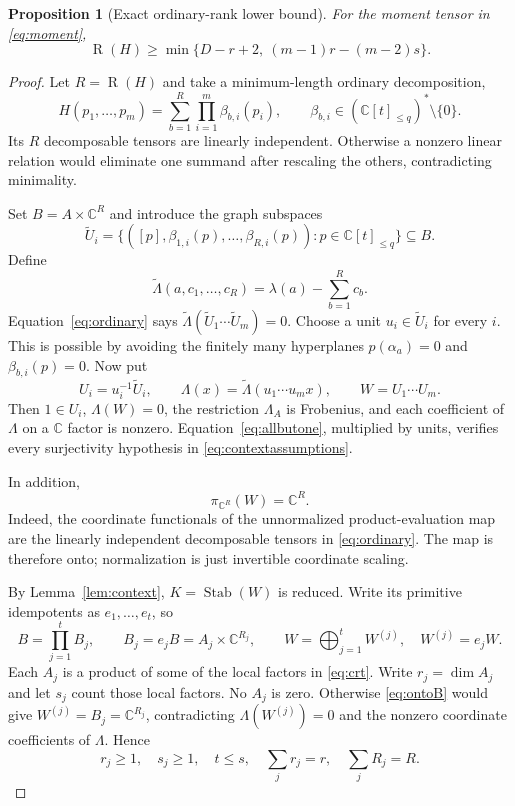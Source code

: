 \documentclass[11pt]{article}
\newtheorem{proposition}[theorem]{Proposition}
\theoremstyle{definition}
\theoremstyle{remark}
\newcommand{\C}{\mathbb C}
\newcommand{\Rk}{\operatorname{R}}
\newcommand{\Stab}{\operatorname{Stab}}
\newcommand{\Pq}{\C[t]_{\le q}}
\begin{document}
\begin{proposition}[Exact ordinary-rank lower bound]\label{prop:lower}
For the moment tensor in \eqref{eq:moment},
\begin{equation}\label{eq:lower}
 \Rk(H)\ge\min\{D-r+2,\ (m-1)r-(m-2)s\}.
\end{equation}
\end{proposition}
\begin{proof}
Let $R=\Rk(H)$ and take a minimum-length ordinary decomposition,
\begin{equation}\label{eq:ordinary}
 H(p_1,\ldots,p_m)=\sum_{b=1}^R\prod_{i=1}^m\beta_{b,i}(p_i),
 \qquad \beta_{b,i}\in(\Pq)^*\setminus\{0\}.
\end{equation}
Its $R$ decomposable tensors are linearly independent. Otherwise a nonzero
linear relation would eliminate one summand after rescaling the others,
contradicting minimality.

Set $B=A\times\C^R$ and introduce the graph subspaces
\[
 \widetilde U_i=
 \{([p],\beta_{1,i}(p),\ldots,\beta_{R,i}(p)):p\in\Pq\}\subseteq B.
\]
Define
\[
 \widetilde\Lambda(a,c_1,\ldots,c_R)=\lambda(a)-\sum_{b=1}^R c_b.
\]
Equation~\eqref{eq:ordinary} says
$\widetilde\Lambda(\widetilde U_1\cdots\widetilde U_m)=0$.
Choose a unit $u_i\in\widetilde U_i$ for every $i$.
This is possible by avoiding the finitely many hyperplanes
$p(\alpha_a)=0$ and $\beta_{b,i}(p)=0$.
Now put
\begin{equation}\label{eq:normalize}
 U_i=u_i^{-1}\widetilde U_i,\qquad
 \Lambda(x)=\widetilde\Lambda(u_1\cdots u_mx),\qquad
 W=U_1\cdots U_m.
\end{equation}
Then $1\in U_i$, $\Lambda(W)=0$, the restriction $\Lambda_A$ is Frobenius,
and each coefficient of $\Lambda$ on a $\C$ factor is nonzero.
Equation~\eqref{eq:allbutone}, multiplied by units, verifies every surjectivity
hypothesis in \eqref{eq:contextassumptions}.

In addition,
\begin{equation}\label{eq:ontoB}
 \pi_{\C^R}(W)=\C^R.
\end{equation}
Indeed, the coordinate functionals of the unnormalized product-evaluation map
are the linearly independent decomposable tensors in \eqref{eq:ordinary}.
The map is therefore onto; normalization is just invertible coordinate scaling.

By Lemma~\ref{lem:context}, $K=\Stab(W)$ is reduced. Write its primitive
idempotents as $e_1,\ldots,e_t$, so
\[
 B=\prod_{j=1}^t B_j,\qquad B_j=e_jB=A_j\times\C^{R_j},\qquad
 W=\bigoplus_{j=1}^t W^{(j)},\quad W^{(j)}=e_jW.
\]
Each $A_j$ is a product of some of the local factors in \eqref{eq:crt}.
Write $r_j=\dim A_j$ and let $s_j$ count those local factors.
No $A_j$ is zero. Otherwise \eqref{eq:ontoB} would give
$W^{(j)}=B_j=\C^{R_j}$, contradicting $\Lambda(W^{(j)})=0$ and the nonzero
coordinate coefficients of $\Lambda$. Hence
\begin{equation}\label{eq:partitions}
 r_j\ge1,\quad s_j\ge1,\quad t\le s,\quad
 \sum_j r_j=r,\quad\sum_jR_j=R.
\end{equation}


\end{proof}
\end{document}
